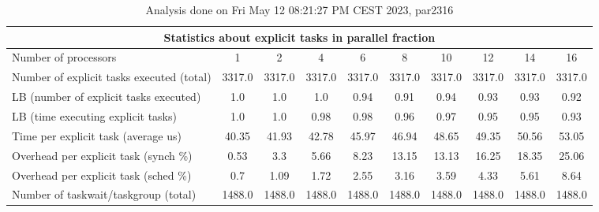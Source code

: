 \begin{table}[h]
\begin{center}
\begin{tabular}{|l|c|c|c|c|c|c|c|c|c|}
\hline
\multicolumn{10}{|c|}{Statistics about explicit tasks in parallel fraction} \\
\hline
\hline
Number of processors & 1 & 2 & 4 & 6 & 8 & 10 & 12 & 14 & 16 \\
\hline
\hline
Number of explicit tasks executed (total)        &          3317.0 &          3317.0 &          3317.0 &          3317.0 &          3317.0 &          3317.0 &          3317.0 &          3317.0 &          3317.0 \\
\hline
LB (number of explicit tasks executed)           &             1.0 &             1.0 &             1.0 &            0.94 &            0.91 &            0.94 &            0.93 &            0.93 &            0.92 \\
\hline
LB (time executing explicit tasks)               &             1.0 &             1.0 &            0.98 &            0.98 &            0.96 &            0.97 &            0.95 &            0.95 &            0.93 \\
\hline
Time per explicit task (average us)                 &           40.35 &           41.93 &           42.78 &           45.97 &           46.94 &           48.65 &           49.35 &           50.56 &           53.05 \\
\hline
Overhead per explicit task (synch \%)             &            0.53 &             3.3 &            5.66 &            8.23 &           13.15 &           13.13 &           16.25 &           18.35 &           25.06 \\
\hline
Overhead per explicit task (sched \%)             &             0.7 &            1.09 &            1.72 &            2.55 &            3.16 &            3.59 &            4.33 &            5.61 &            8.64 \\
\hline
Number of taskwait/taskgroup (total)             &          1488.0 &          1488.0 &          1488.0 &          1488.0 &          1488.0 &          1488.0 &          1488.0 &          1488.0 &          1488.0 \\
\hline
\end{tabular}
\end{center}
\caption{ Analysis done on Fri May 12 08:21:27 PM CEST 2023, par2316}
\end{table}
